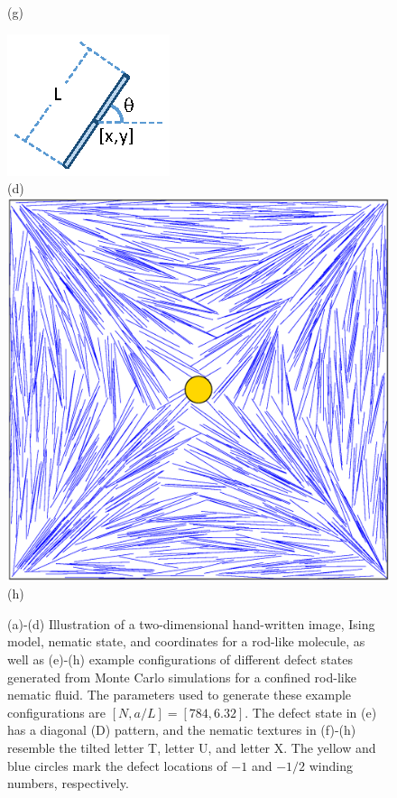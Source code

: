 \begin{figure}[!t]
\begin{minipage}[t]{0.25\textwidth}
		(g)
	\end{minipage}%
	\begin{minipage}[t]{0.25\textwidth}
		\centering
		\includegraphics[width=0.9\columnwidth]{./figs/FIG1D.eps}\\
		(d)\\ \vspace{0.5cm}
		\includegraphics[width=0.9\columnwidth]{./figs/FIG1H.eps}\\
		(h)
	\end{minipage}%
	\caption{(a)-(d) Illustration of a two-dimensional hand-written image, Ising model, nematic state, and coordinates for a rod-like molecule,
		as well as (e)-(h) example configurations of different defect states generated from
		Monte Carlo simulations for a
		confined rod-like nematic fluid.
		The parameters used to generate these example configurations are $[N,a/L]=[784,6.32]$.
		The defect state in (e) has a diagonal (D) pattern, and
		the nematic textures in (f)-(h) resemble the tilted letter T, letter U, and letter X. The yellow and blue circles mark the defect locations of $-1$ and $-1/2$ winding numbers, respectively.
	}
	\label{FIG1}
\end{figure}

